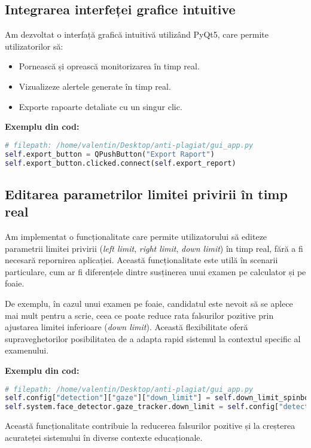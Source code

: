\documentclass[12pt,a4paper]{article}
\begin{document}
\subsection{Integrarea interfeței grafice intuitive}
Am dezvoltat o interfață grafică intuitivă utilizând PyQt5, care permite utilizatorilor să:
\begin{itemize}
    \item Pornească și oprească monitorizarea în timp real.
    \item Vizualizeze alertele generate în timp real.
    \item Exporte rapoarte detaliate cu un singur clic.
\end{itemize}

\textbf{Exemplu din cod:}
\begin{lstlisting}[language=Python]
# filepath: /home/valentin/Desktop/anti-plagiat/gui_app.py
self.export_button = QPushButton("Export Raport")
self.export_button.clicked.connect(self.export_report)
\end{lstlisting}

\subsection{Editarea parametrilor limitei privirii în timp real}
Am implementat o funcționalitate care permite utilizatorului să editeze parametrii limitei privirii (\textit{left limit}, \textit{right limit}, \textit{down limit}) în timp real, fără a fi necesară repornirea aplicației. Această funcționalitate este utilă în scenarii particulare, cum ar fi diferențele dintre susținerea unui examen pe calculator și pe foaie. 

De exemplu, în cazul unui examen pe foaie, candidatul este nevoit să se aplece mai mult pentru a scrie, ceea ce poate reduce rata falsurilor pozitive prin ajustarea limitei inferioare (\textit{down limit}). Această flexibilitate oferă supraveghetorilor posibilitatea de a adapta rapid sistemul la contextul specific al examenului.

\textbf{Exemplu din cod:}
\begin{lstlisting}[language=Python]
# filepath: /home/valentin/Desktop/anti-plagiat/gui_app.py
self.config["detection"]["gaze"]["down_limit"] = self.down_limit_spinbox.value() / 100
self.system.face_detector.gaze_tracker.down_limit = self.config["detection"]["gaze"]["down_limit"]
\end{lstlisting}

Această funcționalitate contribuie la reducerea falsurilor pozitive și la creșterea acurateței sistemului în diverse contexte educaționale.
\end{document}
